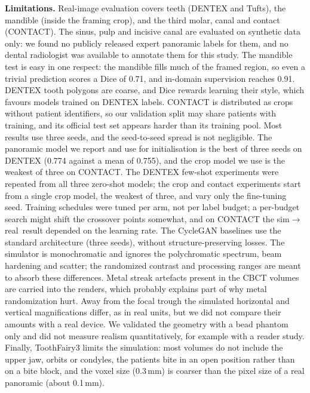 \documentclass[preprint,12pt]{elsarticle}
\newcommand{\sr}{sim$\to$real}
\begin{document}
\textbf{Limitations.} Real-image evaluation covers teeth (DENTEX and Tufts), the mandible (inside the framing crop), and
the third molar, canal and contact (CONTACT). The
sinus, pulp and incisive canal are evaluated on synthetic data only: we found no publicly released expert panoramic labels for
them, and no dental radiologist was available to annotate them for this study. The mandible test is easy in one
respect: the mandible fills much of the framed region, so even a trivial prediction scores a Dice of 0.71, and in-domain supervision reaches 0.91. DENTEX tooth
polygons are coarse, and Dice rewards learning their style, which favours
models trained on DENTEX labels. CONTACT is distributed as crops without patient identifiers, so our validation split may
share patients with training, and its official test set appears harder than its training pool. Most results use three
seeds, and the seed-to-seed spread is not negligible. The panoramic model we report and use for initialisation is the
best of three seeds on DENTEX (0.774 against a mean of 0.755), and the crop model we use is the weakest of three on
CONTACT. The DENTEX few-shot experiments were repeated from all three zero-shot models; the crop and contact
experiments start from a single crop model, the weakest of three, and vary only the fine-tuning seed. Training schedules
were tuned per arm, not per label budget; a per-budget search might shift the crossover points somewhat, and on CONTACT
the \sr\ result depended on the learning rate. The CycleGAN baselines use the standard architecture
(three seeds), without structure-preserving losses.
The simulator is monochromatic and ignores the polychromatic spectrum, beam hardening and scatter; the randomized
contrast and processing ranges are meant to absorb these differences. Metal streak artefacts present in the CBCT volumes
are carried into the renders, which probably explains part of why metal randomization hurt. Away from the focal trough
the simulated horizontal and vertical magnifications differ, as in real units, but we did not compare their amounts
with a real device. We validated the geometry with a bead phantom only and did not measure realism quantitatively, for
example with a reader study. Finally, ToothFairy3 limits the simulation: most volumes do not include the upper jaw,
orbits or condyles, the patients bite in an open position rather than on a bite block, and the voxel size (0.3\,mm) is
coarser than the pixel size of a real panoramic (about 0.1\,mm).

\end{document}
